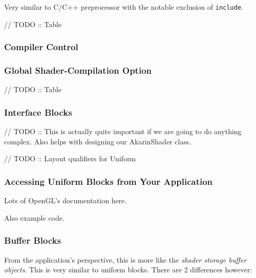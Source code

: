 \documentclass[a4paper, 12pt]{article}
\newcounter{subsubsubsection}[subsubsection]
\begin{document}

Very similar to C/C++ preprocessor with the notable exclusion of \verb|include|.

// TODO :: Table


\subsubsection{Compiler Control}


\subsubsection{Global Shader-Compilation Option}


// TODO :: Table

\subsubsection{Interface Blocks}

// TODO :: This is actually quite important if we are going to do anything complex.
Also helps with designing our AkarinShader class.


// TODO :: Layout qualifiers for Uniform


\subsubsection{Accessing Uniform Blocks from Your Application}

Lots of OpenGL's documentation here.

Also example code.

\subsubsection{Buffer Blocks}

From the application's perspective, this is more like the \textit{shader storage buffer objects}.
This is very similar to uniform blocks.
There are 2 differences however:
\end{document}
